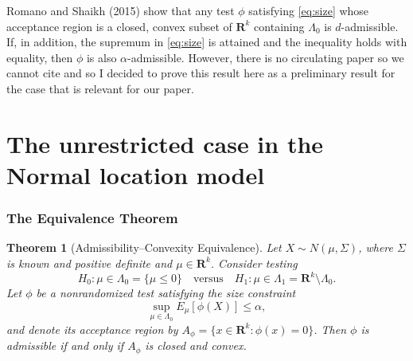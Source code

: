 \documentclass[12pt]{article}
\newtheorem{theorem}{Theorem}
\theoremstyle{definition}
\theoremstyle{remark}
\begin{document}
Romano and Shaikh (2015) show that any test $\phi$ satisfying \eqref{eq:size} whose acceptance region is a closed, convex subset of $\mathbf{R}^k$ containing $\Lambda_0$ is $d$-admissible.  If, in addition, the supremum in \eqref{eq:size} is attained and the inequality holds with equality, then $\phi$ is also $\alpha$-admissible. However, there is no circulating paper so we cannot cite and so I decided to prove this result here as a preliminary result for the case that is relevant for our paper. 

\newpage 

\section*{The unrestricted case in the Normal location model}

\subsubsection*{The Equivalence Theorem}

\begin{theorem}[Admissibility–Convexity Equivalence]
\label{thm:admissibility-convexity}
Let $X \sim N(\mu,\Sigma)$, where $\Sigma$ is known and positive definite and
$\mu \in \mathbf{R}^k$.
Consider testing
\[
H_0 : \mu \in \Lambda_0 = \{\mu \le 0\}
\quad \text{versus} \quad
H_1 : \mu \in \Lambda_1 = \mathbf{R}^k \setminus \Lambda_0.
\]
Let $\phi$ be a nonrandomized test satisfying the size constraint
\[
\sup_{\mu \in \Lambda_0} E_\mu[\phi(X)] \le \alpha,
\]
and denote its acceptance region by
$A_\phi = \{x \in \mathbf{R}^k : \phi(x) = 0\}$.
Then $\phi$ is admissible if and only if $A_\phi$ is closed and convex.
\end{theorem}
\end{document}
